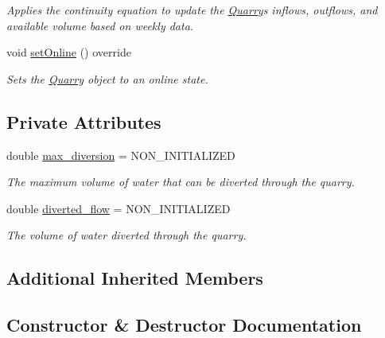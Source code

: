\begin{DoxyCompactItemize}
\begin{DoxyCompactList}\small\item\em Applies the continuity equation to update the \mbox{\hyperlink{classQuarry}{Quarry}}\textquotesingle{}s inflows, outflows, and available volume based on weekly data. \end{DoxyCompactList}\item 
void \mbox{\hyperlink{classQuarry_af5fe04fa188d399485b2b4e64381e169}{set\+Online}} () override
\begin{DoxyCompactList}\small\item\em Sets the \mbox{\hyperlink{classQuarry}{Quarry}} object to an online state. \end{DoxyCompactList}\end{DoxyCompactItemize}
\subsection*{Private Attributes}
\begin{DoxyCompactItemize}
\item 
double \mbox{\hyperlink{classQuarry_a5cb60f94475d5991a795cb9117e0b83f}{max\+\_\+diversion}} = N\+O\+N\+\_\+\+I\+N\+I\+T\+I\+A\+L\+I\+Z\+ED
\begin{DoxyCompactList}\small\item\em The maximum volume of water that can be diverted through the quarry. \end{DoxyCompactList}\item 
double \mbox{\hyperlink{classQuarry_ac2fe4ae274f23b1cc932655c5fb6263d}{diverted\+\_\+flow}} = N\+O\+N\+\_\+\+I\+N\+I\+T\+I\+A\+L\+I\+Z\+ED
\begin{DoxyCompactList}\small\item\em The volume of water diverted through the quarry. \end{DoxyCompactList}\end{DoxyCompactItemize}
\subsection*{Additional Inherited Members}


\subsection{Constructor \& Destructor Documentation}
\mbox{\label{classQuarry_a126fddda9e5deeb667a6a9dbb0533470}} 
